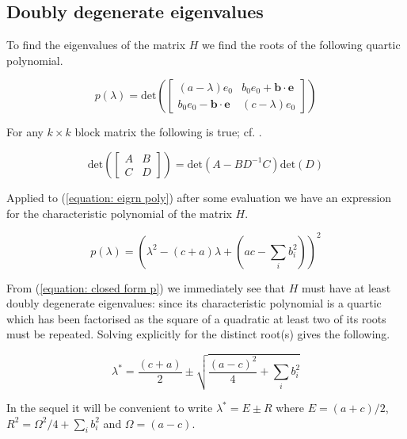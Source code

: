 \documentclass{article}
\begin{document}
\subsection*{Doubly degenerate eigenvalues}

To find the eigenvalues of the matrix $H$ we find the roots of the following quartic polynomial. 

\begin{equation}
	p \left ( \lambda \right ) = \text{det} \left ( \begin{bmatrix}
(a - \lambda) e_0 & b_0 e_0 + \mathbf{b \cdot e} \\ 
b_0 e_0 - \mathbf{b \cdot e} & (c - \lambda) e_0 
\end{bmatrix} \right ) 
\label{equation: eigrn poly}
\end{equation}

For any $k \times k$ block matrix the following is true; cf. \cite{powell2011calculating}. 

\begin{equation}
	\text{det} \left ( \begin{bmatrix} A & B \\ C & D \end{bmatrix}	 \right ) = \text{det} \left ( A - B D^{-1}C \right ) \text{det} \left( D \right ) 
\end{equation}

Applied to (\ref{equation: eigrn poly}) after some evaluation we have an expression for the characteristic polynomial of the matrix $H$. 

\begin{equation}
	p \left ( \lambda \right ) = \left ( \lambda^2 - (c+a) \lambda + \left ( ac - \sum_i b_i^2 \right ) \right ) ^ 2
	\label{equation: closed form p}
\end{equation}

From (\ref{equation: closed form p}) we immediately see that $H$ must have at least doubly degenerate eigenvalues: since its characteristic polynomial is a quartic which has been factorised as the square of a quadratic at least two of its roots must be repeated. Solving explicitly for the distinct root(s) gives the following.

\begin{equation}
	\lambda^* = \frac{(c+a)}{2} \pm \sqrt{\frac{(a-c)^2}{4} + \sum_i b_i^2}
\end{equation}

In the sequel it will be convenient to write $\lambda^* = E \pm R$ where $E = (a+c)/2$, $R^2 = \Omega^2/4 + \sum_i b_i^2$ and $\Omega = (a-c)$. 
\end{document}
